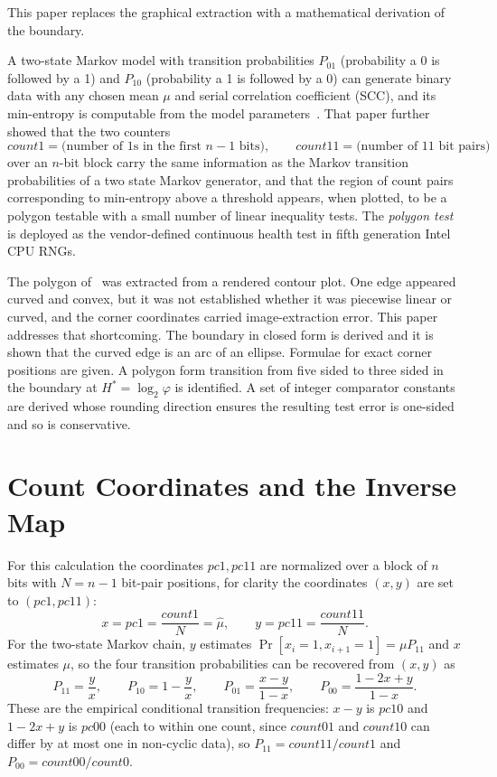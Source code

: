 \documentclass[11pt]{article}
\begin{document}
This paper replaces the graphical extraction with a mathematical derivation of the
boundary. 

A two-state Markov model with transition probabilities $P_{01}$ (probability a
0 is followed by a 1) and $P_{10}$ (probability a 1 is followed by a 0) can
generate binary data with any chosen mean $\mu$ and serial
correlation coefficient (SCC), and its min-entropy is computable from the
model parameters~\cite{johnston2024}. That paper further showed that the two
counters
\[
\mathit{count1}=\text{(number of 1s in the first $n-1$ bits)},\qquad
\mathit{count11}=\text{(number of 11 bit pairs)}
\]
over an $n$-bit block carry the same information as the Markov transition
probabilities of a two state Markov generator,
and that the region of count pairs corresponding to min-entropy above a
threshold appears, when plotted, to be a polygon testable with a small number
of linear inequality tests. The \emph{polygon test} is deployed as the
vendor-defined continuous health test in fifth generation Intel CPU RNGs.

The polygon of~\cite{johnston2024} was extracted from a rendered contour
plot. One edge appeared curved and convex, but it was not established whether
it was piecewise linear or curved, and the corner coordinates carried
image-extraction error. This paper addresses that shortcoming. The boundary in
closed form is derived and it is shown that the curved edge is an arc
of an ellipse. Formulae for exact corner positions are given. A polygon
form transition from five sided to three sided in the boundary at
$H^\ast=\log_2\varphi$ is identified. A set of integer comparator constants
are derived whose rounding
direction ensures the resulting test error is one-sided and so is conservative.

\section{Count Coordinates and the Inverse Map}
\label{sec:inverse}

For this calculation the coordinates $pc1, pc11$ are normalized over a block of $n$ bits with $N=n-1$ bit-pair positions, for clarity the coordinates $(x,y)$ are set to $(pc1,pc11)$:
\[
x = \mathit{pc1} = \frac{\mathit{count1}}{N} = \hat\mu, \qquad
y = \mathit{pc11} = \frac{\mathit{count11}}{N}.
\]
For the two-state Markov chain, $y$ estimates
$\Pr[x_i{=}1, x_{i+1}{=}1]=\mu P_{11}$ and $x$ estimates $\mu$, so the four
transition probabilities can be recovered from $(x,y)$ as
\begin{equation}
P_{11}=\frac{y}{x},\qquad
P_{10}=1-\frac{y}{x},\qquad
P_{01}=\frac{x-y}{1-x},\qquad
P_{00}=\frac{1-2x+y}{1-x}.
\label{eq:inverse}
\end{equation}
These are the empirical conditional transition frequencies:
$x-y$ is $\mathit{pc10}$ and $1-2x+y$ is $\mathit{pc00}$ (each to within one
count, since $\mathit{count01}$ and $\mathit{count10}$ can differ by at most
one in non-cyclic data), so $P_{11}=\mathit{count11}/\mathit{count1}$ and
$P_{00}=\mathit{count00}/\mathit{count0}$.
\end{document}
